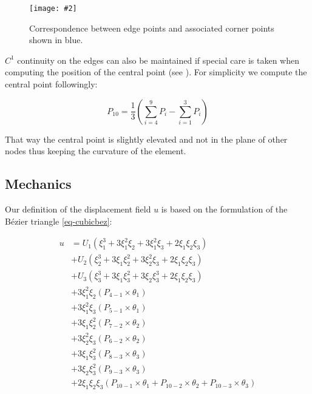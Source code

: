 \documentclass{egpubl}
\newcommand{\Figure}[3]{%
\begin{figure}[htb]
  \centering
  \texttt{[image: \#2]}
  \caption{\label{fig-#2}#3}
\end{figure}}
\begin{document}
\Figure{0.8\linewidth}{segments}
{Correspondence between edge points and associated corner points shown in
blue.}

$C^1$ continuity on the edges can also be maintained if special care is taken
when computing the position of the central point (see \cite{Ubach2010}). For
simplicity we compute the central point followingly:

\begin{equation}\label{eq-central}
    P_{10} = \frac{1}{3}(\sum_{i=4}^9 P_i - \sum_{i=1}^3 P_i)
\end{equation}


That way the central point is slightly elevated and not in the plane of
other nodes thus keeping the curvature of the element.



\subsection{Mechanics}

Our definition of the displacement field $u$ is based on the formulation of the
Bézier triangle \eqref{eq-cubicbez}:

\begin{equation}\label{eq-bezU}
\begin{split}
  u & = U_1 ( \xi_1^3 + 3 \xi_1^2 \xi_2 + 3 \xi_1^2 \xi_3
        + 2 \xi_1 \xi_2 \xi_3 ) \\
    & + U_2 ( \xi_2^3 + 3 \xi_1 \xi_2^2 + 3 \xi_2^2 \xi_3
        + 2 \xi_1 \xi_2 \xi_3 ) \\
    & + U_3 ( \xi_3^3 + 3 \xi_1 \xi_3^2 + 3 \xi_2 \xi_3^3
        + 2 \xi_1 \xi_2 \xi_3 ) \\
    & + 3 \xi_1^2 \xi_2 (P_{4-1} \times \theta_1) \\
    & + 3 \xi_1^2 \xi_3 (P_{5-1} \times \theta_1) \\
    & + 3 \xi_1 \xi_2^2 (P_{7-2} \times \theta_2) \\
    & + 3 \xi_2^2 \xi_3 (P_{6-2} \times \theta_2) \\
    & + 3 \xi_1 \xi_3^2 (P_{8-3} \times \theta_3) \\
    & + 3 \xi_2 \xi_3^2 (P_{9-3} \times \theta_3) \\
    & + 2 \xi_1 \xi_2 \xi_3 (P_{10-1} \times \theta_1 +
        P_{10-2} \times \theta_2 +
        P_{10-3} \times \theta_3)
\end{split}
\end{equation}
\end{document}
